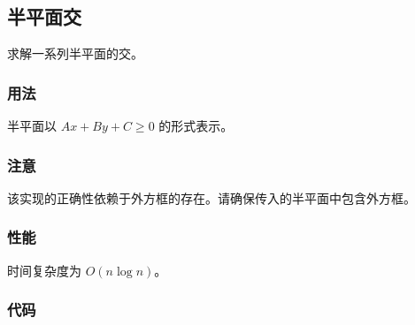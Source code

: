 \subsection{半平面交}

求解一系列半平面的交。

\subsubsection{用法}

半平面以 $Ax + By + C \ge 0$ 的形式表示。

\subsubsection{注意}

该实现的正确性依赖于外方框的存在。请确保传入的半平面中包含外方框。

\subsubsection{性能}

时间复杂度为 $O(n \log n)$。

\subsubsection{代码}


